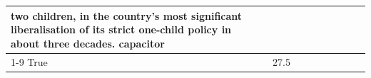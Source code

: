 \begin{table}[H]
\begin{tabular}{lllrlllll}
two children, in the country's most significant liberalisation of its strict one-child policy in about three decades. capacitor \\
\cline{1-9}
True & 27.5%
\end{tabular}
\end{table}
